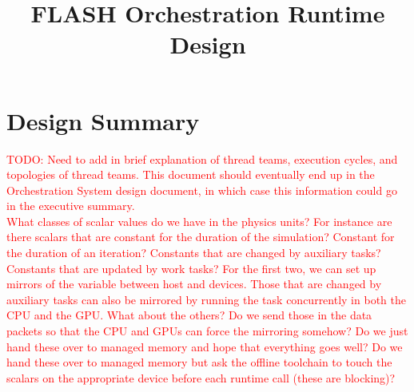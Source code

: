 \documentclass{article}
\title{FLASH Orchestration Runtime Design}
\begin{document}
\theoremstyle{definition} %
\newtheorem{req}{Req}[section]
\newtheorem{spec}{Spec}[section]

\maketitle

\section{Design Summary}
\textcolor{red}{TODO: Need to add in brief explanation of thread teams,
execution cycles, and topologies of thread teams.  This document should
eventually end up in the Orchestration System design document, in which case
this information could go in the executive summary.}\\

\textcolor{red}{What classes of scalar values do we have in the physics units?
For instance are there scalars that are constant for the duration of the
simulation?  Constant for the duration of an iteration?  Constants that are
changed by auxiliary tasks?  Constants that are updated by work tasks?  For the
first two, we can set up mirrors of the variable between host and devices.
Those that are changed by auxiliary tasks can also be mirrored by running the
task concurrently in both the CPU and the GPU.  What about the others?  Do we
send those in the data packets so that the CPU and GPUs can force the mirroring
somehow?  Do we just hand these over to managed memory and hope that everything
goes well?  Do we hand these over to managed memory but ask the offline
toolchain to touch the scalars on the appropriate device before each runtime
call (these are blocking)?}
\end{document}
